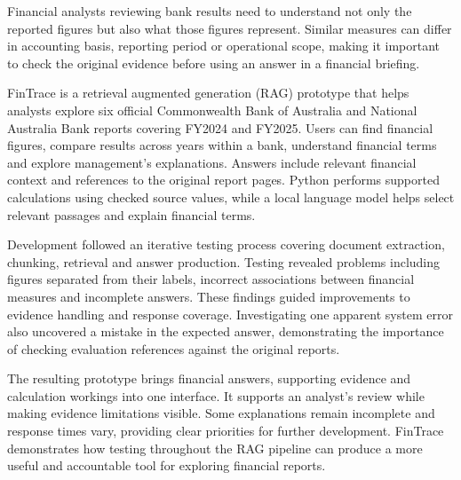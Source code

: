 Financial analysts reviewing bank results need to understand not only the reported figures but also what those figures represent. Similar measures can differ in accounting basis, reporting period or operational scope, making it important to check the original evidence before using an answer in a financial briefing.

FinTrace is a retrieval augmented generation (RAG) prototype that helps analysts explore six official Commonwealth Bank of Australia and National Australia Bank reports covering FY2024 and FY2025. Users can find financial figures, compare results across years within a bank, understand financial terms and explore management's explanations. Answers include relevant financial context and references to the original report pages. Python performs supported calculations using checked source values, while a local language model helps select relevant passages and explain financial terms.

Development followed an iterative testing process covering document extraction, chunking, retrieval and answer production. Testing revealed problems including figures separated from their labels, incorrect associations between financial measures and incomplete answers. These findings guided improvements to evidence handling and response coverage. Investigating one apparent system error also uncovered a mistake in the expected answer, demonstrating the importance of checking evaluation references against the original reports.

The resulting prototype brings financial answers, supporting evidence and calculation workings into one interface. It supports an analyst's review while making evidence limitations visible. Some explanations remain incomplete and response times vary, providing clear priorities for further development. FinTrace demonstrates how testing throughout the RAG pipeline can produce a more useful and accountable tool for exploring financial reports.
